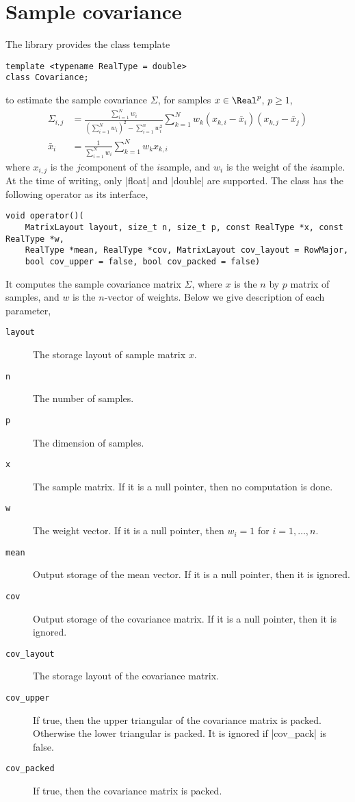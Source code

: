 \section{Sample covariance}
\label{sec:Sample covariance}

The library provides the class template
\begin{verbatim}
template <typename RealType = double>
class Covariance;
\end{verbatim}
to estimate the sample covariance $\Sigma$, for samples $x\in\Real^p$, $p\ge1$,
\begin{align*}
  \Sigma_{i,j} &= \frac{\sum_{i=1}^N w_i}
  {(\sum_{i=1}^N w_i)^2 - \sum_{i=1}^n w_i^2}
  \sum_{k=1}^N w_k (x_{k,i} - \bar{x}_i)(x_{k,j} - \bar{x}_j) \\
  \bar{x}_i &= \frac{1}{\sum_{i=1}^N w_i}\sum_{k=1}^N w_k x_{k,i}
\end{align*}
where $x_{i,j}$ is the $j$\sth component of the $i$\sth sample, and $w_i$ is
the weight of the $i$\sth sample. At the time of writing, only |float| and
|double| are supported. The class has the following operator as its interface,
\begin{verbatim}
void operator()(
    MatrixLayout layout, size_t n, size_t p, const RealType *x, const RealType *w,
    RealType *mean, RealType *cov, MatrixLayout cov_layout = RowMajor,
    bool cov_upper = false, bool cov_packed = false)
\end{verbatim}
It computes the sample covariance matrix $\Sigma$,
where $x$ is the $n$ by $p$ matrix of samples, and $w$ is the $n$-vector of
weights. Below we give description of each parameter,
\begin{description}
  \item[\texttt{layout}] The storage layout of sample matrix $x$.
  \item[\texttt{n}] The number of samples.
  \item[\texttt{p}] The dimension of samples.
  \item[\texttt{x}] The sample matrix. If it is a null pointer, then no
    computation is done.
  \item[\texttt{w}] The weight vector. If it is a null pointer, then $w_i = 1$
    for $i = 1,\dots,n$.
  \item[\texttt{mean}] Output storage of the mean vector. If it is a null
    pointer, then it is ignored.
  \item[\texttt{cov}] Output storage of the covariance matrix. If it is a null
    pointer, then it is ignored.
  \item[\texttt{cov\_layout}] The storage layout of the covariance matrix.
  \item[\texttt{cov\_upper}] If true, then the upper triangular of the
    covariance matrix is packed. Otherwise the lower triangular is packed. It
    is ignored if |cov_pack| is false.
  \item[\texttt{cov\_packed}] If true, then the covariance matrix is
    packed.
\end{description}
